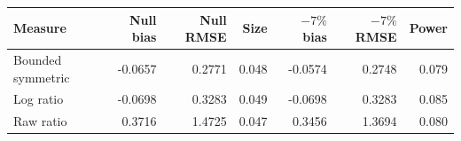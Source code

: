 \begin{tabular}{lrrrrrr}
\toprule
Measure & Null bias & Null RMSE & Size & $-7\%$ bias & $-7\%$ RMSE & Power \\
\midrule
Bounded symmetric & -0.0657 & 0.2771 & 0.048 & -0.0574 & 0.2748 & 0.079 \\
Log ratio & -0.0698 & 0.3283 & 0.049 & -0.0698 & 0.3283 & 0.085 \\
Raw ratio & 0.3716 & 1.4725 & 0.047 & 0.3456 & 1.3694 & 0.080 \\
\bottomrule
\end{tabular}
